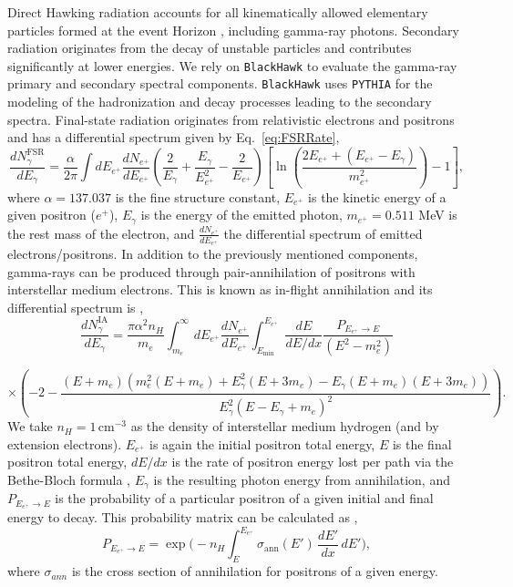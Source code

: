 \documentclass[11pt]{article}
\renewcommand{\cite}{\citep}
\let\RefOrig\ref
\renewcommand{\ref}[1]{\textcolor{blue}{\RefOrig{#1}}}
\begin{document}
Direct Hawking radiation accounts for all kinematically allowed elementary particles formed at the event Horizon \cite{1974Natur.248...30H}, including gamma-ray photons.
Secondary radiation originates from the decay of unstable particles and contributes significantly at lower energies. We rely on \texttt{BlackHawk} \cite{Arbey:2021mbl} to evaluate the gamma-ray primary and secondary spectral components. 
\texttt{BlackHawk} uses \texttt{PYTHIA} \cite{Sjostrand:2014zea} for the modeling of the hadronization and decay processes leading to the secondary spectra.
Final-state radiation originates from relativistic electrons and positrons and has a differential spectrum given by Eq.~\ref{eq:FSRRate},
\begin{equation}
\frac{dN_{\gamma}^{\text{FSR}}}{dE_{\gamma}} = \frac{\alpha}{2\pi} \int dE_{e^{+}} \frac{dN_{e^{+}}}{dE_{e^{+}}} \left( \frac{2}{E_{\gamma}} + \frac{E_{\gamma}}{E_{e^{+}}^2} - \frac{2}{E_{e^{+}}} \right) \left[ \ln \left( \frac{2E_{e^{+}}+(E_{e^{+}} - E_{\gamma})}{m_{e^{+}}^2} \right) - 1 \right],
\label{eq:FSRRate}
\end{equation}
where $\alpha = 137.037$ is the fine structure constant, $E_{e^{+}}$ is the kinetic energy of a given positron ($e^{+}$), $E_{\gamma}$ is the energy of the emitted photon, $m_{e^{+}} = 0.511$ MeV is the rest mass of the electron, and $\frac{dN_{e^{+}}}{dE_{e^{+}}}$ the differential spectrum of emitted electrons/positrons. 
In addition to the previously mentioned components, gamma-rays can be produced through pair-annihilation of positrons with interstellar medium electrons. This is known as in-flight annihilation and its differential spectrum is \cite{Keith:2022sow},
\begin{equation}
\frac{dN_{\gamma}^{\text{IA}}}{dE_{\gamma}} = \frac{\pi \alpha^2 n_H}{m_e} \int_{m_e}^{\infty} dE_{e^{+}} \frac{dN_{e^{+}}}{dE_{e^{+}}} \int_{E_{\min}}^{E_{e^{+}}} \frac{dE}{dE/dx} \frac{P_{E_{e^{+}} \to E}}{(E^2 - m_e^2)}
\end{equation}

\[
\times \left( -2 - \frac{(E + m_e)(m_e^2 (E + m_e) + E_{\gamma}^2 (E + 3m_e) - E_{\gamma} (E + m_e)(E + 3m_e))}{E_{\gamma}^2 (E - E_{\gamma} + m_e)^2} \right).
\]
We take $n_H = 1\, {\textrm{cm}^{-3}}$ as the density of interstellar medium hydrogen (and by extension electrons). $E_{e^{+}}$ is again the initial positron total energy, $E$ is the final positron total energy, $dE/dx$ is the rate of positron energy lost per path via the Bethe-Bloch formula \cite{Bethe1953}, $E_{\gamma}$ is the resulting photon energy from annihilation, and $P_{E_{e^{+}} \to E}$ is the probability of a particular positron of a given initial and final energy to decay. This probability matrix can be calculated as 
\cite{Keith:2022sow},
\begin{equation}
P_{E_{e^{+}} \to E} = \exp\Biggl( 
  - n_H \int_{E}^{E_{e^{+}}} \sigma_{\mathrm{ann}}(E') \,\frac{dE'}{dx}\, dE' 
\Biggr),
\end{equation}
where $\sigma_{ann}$ is the cross section of annihilation for positrons of a given energy.
\end{document}
